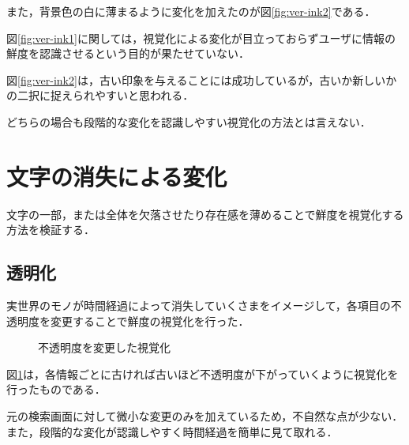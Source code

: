 また，背景色の白に薄まるように変化を加えたのが図\ref{fig:ver-ink2}である．

図\ref{fig:ver-ink1}に関しては，視覚化による変化が目立っておらずユーザに情報の鮮度を認識させるという目的が果たせていない．

図\ref{fig:ver-ink2}は，古い印象を与えることには成功しているが，古いか新しいかの二択に捉えられやすいと思われる．

どちらの場合も段階的な変化を認識しやすい視覚化の方法とは言えない．

\section{文字の消失による変化}
\label{sec:ver-character}

文字の一部，または全体を欠落させたり存在感を薄めることで鮮度を視覚化する方法を検証する．

\subsection{透明化}
\label{subsec:ver-chr-trp}

実世界のモノが時間経過によって消失していくさまをイメージして，各項目の不透明度を変更することで鮮度の視覚化を行った．

\begin{figure}[htbp]
  \begin{center}
  \end{center}
  \caption{不透明度を変更した視覚化}
  \label{fig:ver-transparence}
\end{figure}

図\ref{fig:ver-transparence}は，各情報ごとに古ければ古いほど不透明度が下がっていくように視覚化を行ったものである．

元の検索画面に対して微小な変更のみを加えているため，不自然な点が少ない．また，段階的な変化が認識しやすく時間経過を簡単に見て取れる．

